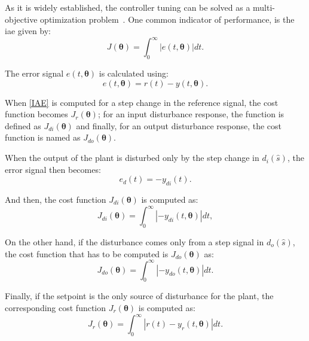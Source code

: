 As it is widely established, the controller tuning can be solved as a multi-objective optimization problem~\citep{Gambier2007}. One common indicator of performance, is the \gls{iae} given by:
%
\begin{equation}  %
J(\bm{\theta})=\int_0^\infty \left |{e(t,\bm{\theta})}\right | dt.
\label{IAE}
\end{equation}

The error signal $e(t, \bm{\theta})$ is calculated using:
%
\begin{equation}  %
e(t,\bm{\theta})=r(t)-y(t,\bm{\theta}).
\label{error}
\end{equation}

When \eqref{IAE} is computed for a step change in the reference signal, the cost function becomes $J_r(\bm{\theta})$; for an input disturbance response, the function is defined as $J_{di}(\bm{\theta})$ and finally, for an output disturbance response, the cost function is named as $J_{do}(\bm{\theta})$.

When the output of the plant is disturbed only by the step change in $d_i(\hat{s})$, the error signal then becomes:
\begin{equation}  %
e_d(t)=-y_{di}(t)
\label{per}.
\end{equation}

And then, the cost function $J_{di}(\bm{\theta})$ is computed as:
\begin{equation}  %
J_{di}(\bm{\theta})= \int_0^\infty  \left |-{y_{di}(t,\bm{\theta})}\right | dt,
\label{perin}
\end{equation}

On the other hand, if the disturbance comes only from a step signal in $d_o(\hat{s})$, the cost function that has to be computed is $J_{do}(\bm{\theta})$ as:
%
\begin{equation}  %
J_{do}(\bm{\theta})= \int_0^\infty  \left |-{y_{do}(t,\bm{\theta})}\right | dt.
\label{perout}
\end{equation}	
%

Finally, if the setpoint is the only source of disturbance for the plant, the corresponding cost function $J_r(\bm{\theta})$ is computed as:
\begin{equation}  %
J_r(\bm{\theta})=\int_0^\infty \left |r(t)-y_r(t,\bm{\theta})\right | dt.
\label{eq:Jr}
\end{equation}
%


